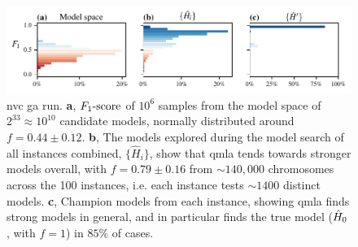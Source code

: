 \begin{figure}
    \begin{center}
        \includegraphics{experimental_study/figures/nv_ga_run_models_by_f.pdf}
    \end{center}
    \caption[Nitrogen-vacancy centre genetic algorithm run]{
        \Acrlong{nvc} \acrlong{ga} \gls{run}.
        \textbf{a}, 
            $ F_{1}\text{-score} $ of $10^6$ samples from the \gls{model space} of $2^{33}\approx10^{10}$ candidate models,
            normally distributed around $f=0.44 \pm 0.12$. 
        \textbf{b}, The models explored during the model search of all \glspl{instance} combined, 
            $\{\hat{H}_i\}$, show that \gls{qmla} tends towards stronger models overall, 
            with $f = 0.79 \pm 0.16$ from $\sim 140,000$ chromosomes across the 100 instances, 
            i.e. each \gls{instance} tests $\sim 1400$ distinct models. 
        \textbf{c}, Champion models from each instance, showing \gls{qmla} finds strong models 
            in general, and in particular finds the \gls{true model} ($\hat{H}_0$, with $f=1$) in $85\%$ of cases.
        }
    \label{fig:nv_ga_run_models}
\end{figure}

